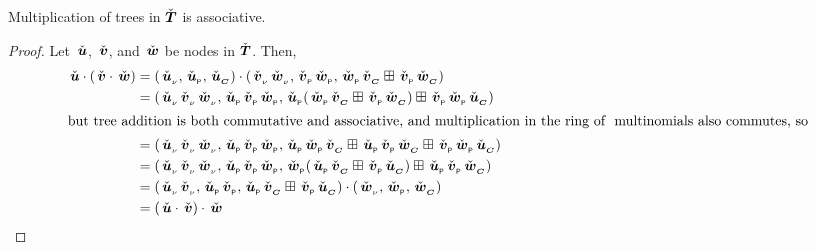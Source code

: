 \begin{proposition}\label{TMassociativity}
Multiplication of trees in $\DOMR$ is associative.
\begin{proof}
  Let $\rnode{u}$, $\rnode{v}$, and $\rnode{w}$ be nodes in $\DOMR$. Then, 
  \begin{align*}
    \rnode{u} \tdot (\rnode{v} \tdot \rnode{w}) &=  \SNode{{u}}\tdot\Node{\rv{v}\rv{w}}{\rlabel{v}\rlabel{w}}{\rlabel{w}\rchild{v}\stplus\rlabel{v}\rchild{w}} \\
    &= \Node{\rv{u}\rv{v}\rv{w}}{\rlabel{u}\rlabel{v}\rlabel{w}}{\rlabel{u}(\rlabel{w}\rchild{v}\stplus\rlabel{v}\rchild{w})\stplus\rlabel{v}\rlabel{w}\rchild{u}} \\
    \intertext{but tree addition is both commutative and associative, and multiplication in the \polytypes\ also commutes, so}
    &= \Node{\rv{u}\rv{v}\rv{w}}{\rlabel{u}\rlabel{v}\rlabel{w}}{\rlabel{u}\rlabel{w}\rchild{v}\stplus\rlabel{u}\rlabel{v}\rchild{w}\stplus\rlabel{v}\rlabel{w}\rchild{u}}\\
    &= \Node{\rv{u}\rv{v}\rv{w}}{\rlabel{u}\rlabel{v}\rlabel{w}}{\rlabel{w}(\rlabel{u}\rchild{v}\stplus\rlabel{v}\rchild{u})\stplus\rlabel{u}\rlabel{v}\rchild{w}}\\
    &= \Node{\rv{u}\rv{v}}{\rlabel{u}\rlabel{v}}{\rlabel{u}\rchild{v}\stplus\rlabel{v}\rchild{u}}\tdot\SNode{w}\\
    &= (\rnode{u} \tdot \rnode{v})\tdot\rnode{w}
  \end{align*}
\end{proof}
\end{proposition}

